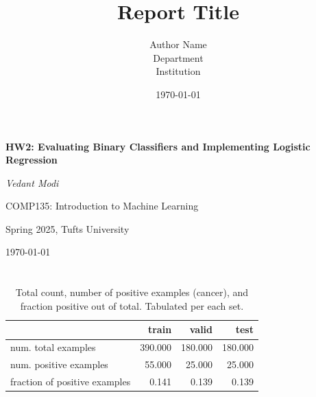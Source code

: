 \documentclass[12pt]{article}
\title{\textbf{Report Title}}
\author{Author Name \\ Department \\ Institution}
\date{\today}
\begin{document}
\begin{titlepage}
    \centering
    \vspace*{2cm}
    {\Huge\bfseries HW2: Evaluating Binary Classifiers and Implementing Logistic Regression\par}
    \vspace{1.5cm}
    {\Large\itshape Vedant Modi\par}
    \vspace{0.5cm}
    {\large COMP135: Introduction to Machine Learning\par}
    {\large Spring 2025, Tufts University \par}
    \vspace{2cm}
    {\large \today\par}
    \vfill
\end{titlepage}

\newpage



\section{}

\begin{table}[h]
    \centering
    \begin{tabular}{lrrr}
        \toprule
         & train & valid & test \\
        \midrule
        num. total examples & 390.000 & 180.000 & 180.000 \\
        num. positive examples & 55.000 & 25.000 & 25.000 \\
        fraction of positive examples & 0.141 & 0.139 & 0.139 \\
        \bottomrule
        \end{tabular}

    \caption{Total count, number of positive examples (cancer), and fraction positive out of total. Tabulated per each set. }
\end{table}
\end{document}
